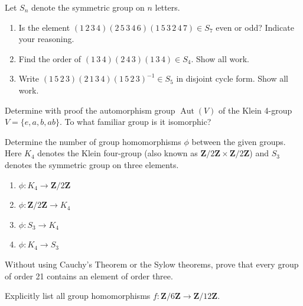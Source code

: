 \documentclass[11pt,twoside,openany]{memoir}
\begin{document}
            \begin{exercise}
            Let $S_n$ denote the symmetric group on $n$ letters.
            \begin{enumerate}[label = (\arabic*)]
                \item Is the element $(1\,2\,3\,4)(2\,5\,3\,4\,6)(1\,5\,3\,2\,4\,7)\in S_7$ even or odd? Indicate your reasoning.
                \item Find the order of $(1\,3\,4)(2\,4\,3)(1\,3\,4)\in S_4$. Show all work.
                \item Write $(1\,5\,2\,3)(2\,1\,3\,4)(1\,5\,2\,3)^{-1}\in S_5$ in disjoint cycle form. Show all work.
            \end{enumerate}
            \end{exercise}
            
            \begin{exercise}
            Determine with proof the automorphism group $\operatorname{Aut}(V)$ of the Klein 4-group $V=\{e,a,b,ab\}$. To what familiar group is it isomorphic?
            \end{exercise}
            
            \begin{exercise}
            Determine the number of group homomorphisms $\phi$ between the given groups. Here $K_4$ denotes the Klein four-group (also known as $\mathbf{Z}/2\mathbf{Z}\times \mathbf{Z}/2\mathbf{Z}$) and $S_3$ denotes the symmetric group on three elements.
            \medskip
            \begin{enumerate}[label = (\arabic*)]
                \item $\phi:K_4\to \mathbf{Z}/2\mathbf{Z}$
                \item $\phi:\mathbf{Z}/2\mathbf{Z}\to K_4$
                \item $\phi:S_3\to K_4$
                \item $\phi:K_4\to S_3$
            \end{enumerate}
            \end{exercise}

            \begin{exercise}
                Without using Cauchy's Theorem or the Sylow theorems, prove that every group of order 21 contains an element of order three.
            \end{exercise}
            
            \begin{exercise}
            Explicitly list all group homomorphisms $f:\mathbf{Z}/6\mathbf{Z} \to \mathbf{Z}/12\mathbf{Z}$.
            \end{exercise}
            
\end{document}
